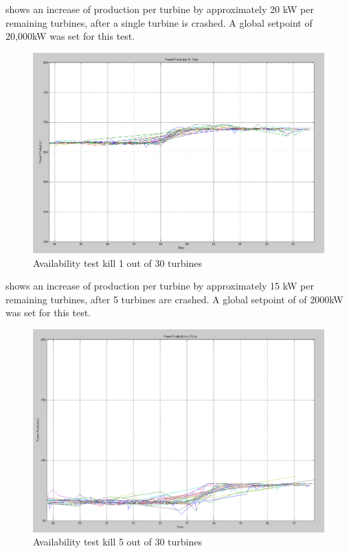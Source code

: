 \clearpage
{} shows an increase of production per turbine by approximately 20 kW per remaining turbines, after a single turbine is crashed. A global setpoint of 20,000kW was set for this test.

\begin{figure} [!h]
	\centering
	\includegraphics[width=\resultsFigureWidthScale\textwidth]{figures/Results/availabilitytest30-29_setpoint_20000.PNG}
	\caption{Availability test kill 1 out of 30 turbines}
	\label{fig:exp:availability_kill1}
\end{figure}

 shows an increase of production per turbine by approximately 15 kW per remaining turbines, after 5 turbines are crashed. A global setpoint of of 2000kW was set for this test.

\begin{figure} [!h]
	\centering
	\includegraphics[width=\resultsFigureWidthScale\textwidth]{figures/Results/availabilitytest30-25_setpoint_2000.PNG}
	\caption{Availability test kill 5 out of 30 turbines}
	\label{fig:exp:availability_kill5}
\end{figure}

